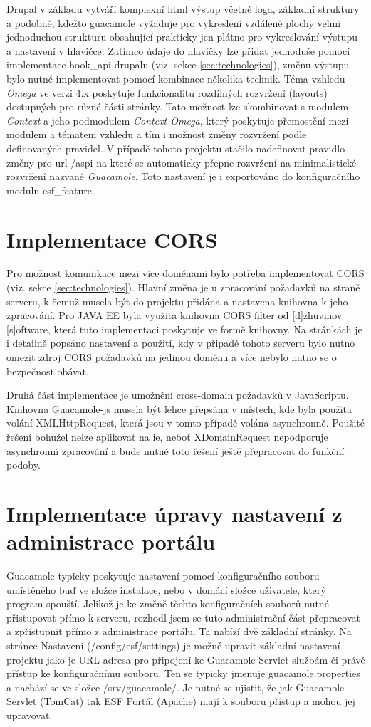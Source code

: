 Drupal v základu vytváří komplexní html výstup včetně loga, základní struktury a podobně, kdežto guacamole vyžaduje pro vykreslení vzdálené plochy velmi jednoduchou strukturu obsahující prakticky jen plátno pro vykreslování výstupu a nastavení v hlavičce. Zatímco údaje do hlavičky lze přidat jednoduše pomocí implementace hook\_api drupalu (viz. sekce \ref{sec:technologies}), změnu výstupu bylo nutné implementovat pomocí kombinace několika technik. Téma vzhledu \emph{Omega} ve verzi 4.x poskytuje funkcionalitu rozdílných rozvržení (layouts) dostupných pro různé části stránky. Tato možnost lze skombinovat s modulem \emph{Context} a jeho podmodulem \emph{Context Omega}, který poskytuje přemostění mezi modulem a tématem vzhledu a tím i možnost změny rozvržení podle definovaných pravidel. V případě tohoto projektu stačilo nadefinovat pravidlo změny pro url /aspi na které se automaticky přepne rozvržení na minimalistické rozvržení nazvané \emph{Guacamole}. Toto nastavení je i exportováno do konfiguračního modulu esf\_feature.

\section{Implementace CORS}
Pro možnost komunikace mezi více doménami bylo potřeba implementovat CORS (viz. sekce \ref{sec:technologies}). Hlavní změna je u zpracování požadavků na straně serveru, k čemuž musela být do projektu přidána a nastavena knihovna k jeho zpracování. Pro JAVA EE byla využita knihovna CORS filter od [d]zhuvinov  [s]oftware\cite{website:cors-filter}, která tuto implementaci poskytuje ve formě knihovny. Na stránkách je i detailně popsáno nastavení a použití, kdy v připadě tohoto serveru bylo nutno omezit zdroj CORS požadavků na jedinou doménu a více nebylo nutno se o bezpečnost obávat.

Druhá část implementace je umožnění cross-domain požadavků v JavaScriptu. Knihovna Guacamole-js musela být lehce přepsána v místech, kde byla použita volání XMLHttpRequest, která jsou v tomto případě volána asynchronně. Použité řešení bohužel nelze aplikovat na \gls{ie}, neboť XDomainRequest nepodporuje asynchronní zpracování a bude nutné toto řešení ještě přepracovat do funkční podoby.

\section{Implementace úpravy nastavení z administrace portálu}
Guacamole typicky poskytuje nastavení pomocí konfiguračního souboru umístěného buď ve složce instalace, nebo v domácí složce uživatele, který program spouští. Jelikož je ke změně těchto konfiguračních souborů nutné přistupovat přímo k serveru, rozhodl jsem se tuto administrační část přepracovat a zpřístupnit přímo z administrace portálu. Ta nabízí dvě základní stránky. Na stránce Nastavení (/config/esf/settings) je možné upravit základní nastavení projektu jako je URL adresa pro připojení ke Guacamole Servlet službám či právě přístup ke konfiguračnímu souboru. Ten se typicky jmenuje guacamole.properties a nachází se ve složce /srv/guacamole/. Je nutné se ujistit, že jak Guacamole Servlet (TomCat) tak ESF Portál (Apache) mají k souboru přístup a mohou jej upravovat.

